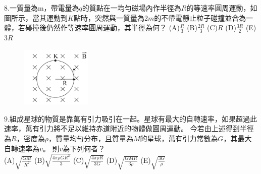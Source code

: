 \documentclass[cn,10pt,math=newtx]{elegantbook}
\begin{document}
\newpage

\begin{example}
   8.一質量為m，帶電量為$q$的質點在一均勻磁場內作半徑為$R$的等速率圓周運動，如圖所示，當其運動到$K$點時，突然與一質量為2$m$的不帶電靜止粒子碰撞並合為一體，若碰撞後仍然作等速率圓周運動，其半徑為何？
   (A)$\frac{R}{3}$ (B)$\frac{2R}{3}$ (C)$R$ (D)$\frac{3R}{2}$ (E)$3R$
   \\
    \rightline{[成德高中教甄109]}
\end{example}
\begin{solution}
    
\end{solution}
\begin{figure}[htbp]
    \flushright
    \includegraphics[width=0.3\textwidth]{image/109成德8.png}
  \end{figure}
\newpage

\begin{example}
   9.組成星球的物質是靠萬有引力吸引在一起。星球有最大的自轉速率，如果超過此速率，萬有引力將不足以維持赤道附近的物體做圓周運動。
   今若由上述得到半徑為$R$，密度為$\rho$，質量均勻分布，且質量為$M$的星球，萬有引力常數為$G$，其最大自轉速率為$v$。
   則$v$為下列何者？\\
   (A)$\sqrt{\frac{GM}{R^2}}$ (B)$\sqrt{\frac{4 \pi \rho G R^2}{3}}$ 
   (C)$\sqrt{\frac{4 \pi \rho  R}{3G}}$ (D)$\sqrt{\frac{GMR}{3 \rho}}$ (E)$\sqrt{\frac{3G}{\rho}}$
   \\
    \rightline{[成德高中教甄109]}
\end{example}
\begin{solution}
    
\end{solution}

\newpage
\end{document}
